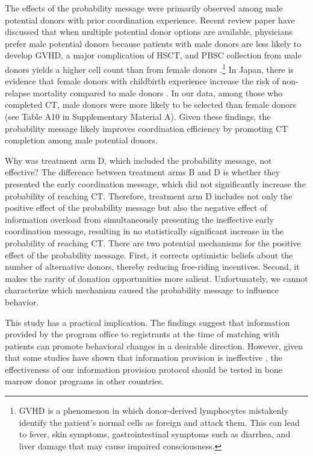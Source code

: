 \documentclass[12pt, a4paper]{article}
\begin{document}
The effects of the probability message were primarily observed among male potential donors with prior coordination experience. Recent review paper have discussed that when multiple potential donor options are available, physicians prefer male potential donors because patients with male donors are less likely to develop GVHD, a major complication of HSCT, and PBSC collection from male donors yields a higher cell count than from female donors \citep{Fingrut2018}.\footnote{GVHD is a phenomenon in which donor-derived lymphocytes mistakenly identify the patient's normal cells as foreign and attack them. This can lead to fever, skin symptoms, gastrointestinal symptoms such as diarrhea, and liver damage that may cause impaired consciousness.} In Japan, there is evidence that female donors with childbirth experience increase the risk of non-relapse mortality compared to male donors \citep{Shinohara2017}. In our data, among those who completed CT, male donors were more likely to be selected than female donors (see Table A10 in Supplementary Material A). Given these findings, the probability message likely improves coordination efficiency by promoting CT completion among male potential donors.

Why was treatment arm D, which included the probability message, not effective? The difference between treatment arms B and D is whether they presented the early coordination message, which did not significantly increase the probability of reaching CT. Therefore, treatment arm D includes not only the positive effect of the probability message but also the negative effect of information overload from simultaneously presenting the ineffective early coordination message, resulting in no statistically significant increase in the probability of reaching CT. There are two potential mechanisms for the positive effect of the probability message. First, it corrects optimistic beliefs about the number of alternative donors, thereby reducing free-riding incentives. Second, it makes the rarity of donation opportunities more salient. Unfortunately, we cannot characterize which mechanism caused the probability message to influence behavior.

This study has a practical implication. The findings suggest that information provided by the program office to registrants at the time of matching with patients can promote behavioral changes in a desirable direction. However, given that some studies have shown that information provision is ineffective \citep[e.g.,][]{Switzer2018}, the effectiveness of our information provision protocol should be tested in bone marrow donor programs in other countries.

\clearpage


\end{document}
